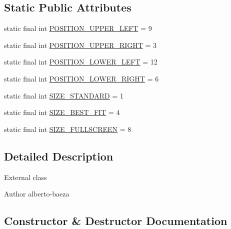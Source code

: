 \subsection*{Static Public Attributes}
\begin{DoxyCompactItemize}
\item 
static final int \hyperlink{classandroid_1_1app_1_1printerapp_1_1devices_1_1camera_1_1_mjpeg_view_ae2f2ec0dd6d0d2c799d3f8355812aee4}{P\+O\+S\+I\+T\+I\+O\+N\+\_\+\+U\+P\+P\+E\+R\+\_\+\+L\+E\+FT} = 9
\item 
static final int \hyperlink{classandroid_1_1app_1_1printerapp_1_1devices_1_1camera_1_1_mjpeg_view_a0788bc30be6973d1a18f1f88d8f23f1d}{P\+O\+S\+I\+T\+I\+O\+N\+\_\+\+U\+P\+P\+E\+R\+\_\+\+R\+I\+G\+HT} = 3
\item 
static final int \hyperlink{classandroid_1_1app_1_1printerapp_1_1devices_1_1camera_1_1_mjpeg_view_aa890b21bd353edbbbecac373c4d79a26}{P\+O\+S\+I\+T\+I\+O\+N\+\_\+\+L\+O\+W\+E\+R\+\_\+\+L\+E\+FT} = 12
\item 
static final int \hyperlink{classandroid_1_1app_1_1printerapp_1_1devices_1_1camera_1_1_mjpeg_view_af4a0b986bb74c56d02564443b37a9759}{P\+O\+S\+I\+T\+I\+O\+N\+\_\+\+L\+O\+W\+E\+R\+\_\+\+R\+I\+G\+HT} = 6
\item 
static final int \hyperlink{classandroid_1_1app_1_1printerapp_1_1devices_1_1camera_1_1_mjpeg_view_a1b9ca9bfaab66b4e25c729c53b13c677}{S\+I\+Z\+E\+\_\+\+S\+T\+A\+N\+D\+A\+RD} = 1
\item 
static final int \hyperlink{classandroid_1_1app_1_1printerapp_1_1devices_1_1camera_1_1_mjpeg_view_a409110c5e75c789debe1507d5942fd51}{S\+I\+Z\+E\+\_\+\+B\+E\+S\+T\+\_\+\+F\+IT} = 4
\item 
static final int \hyperlink{classandroid_1_1app_1_1printerapp_1_1devices_1_1camera_1_1_mjpeg_view_aadb0f4c3f55a273a0db9daca15e852c0}{S\+I\+Z\+E\+\_\+\+F\+U\+L\+L\+S\+C\+R\+E\+EN} = 8
\end{DoxyCompactItemize}


\subsection{Detailed Description}
External class \begin{DoxyAuthor}{Author}
alberto-\/baeza 
\end{DoxyAuthor}


\subsection{Constructor \& Destructor Documentation}
\mbox{\label{classandroid_1_1app_1_1printerapp_1_1devices_1_1camera_1_1_mjpeg_view_a2fbd2b846961a756d86c14643c3ce43b}} 

